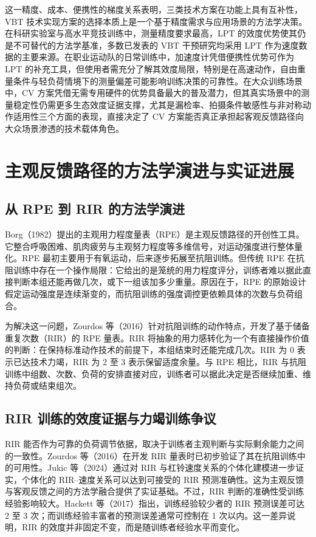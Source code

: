 \documentclass[UTF8,zihao=-4,twoside,openany]{ctexbook}
\begin{document}
这一精度、成本、便携性的梯度关系表明，三类技术方案在功能上具有互补性，VBT 技术实现方案的选择本质上是一个基于精度需求与应用场景的方法学决策。在科研实验室与高水平竞技训练中，测量精度要求最高，LPT 的效度优势使其仍是不可替代的方法学基准，多数已发表的 VBT 干预研究均采用 LPT 作为速度数据的主要来源。在职业运动队的日常训练中，加速度计凭借便携性优势可作为 LPT 的补充工具，但使用者需充分了解其效度局限，特别是在高速动作，自由重量条件与轻负荷情境下的测量偏差可能影响训练决策的可靠性。在大众训练场景中，CV 方案凭借无需专用硬件的优势具备最大的普及潜力，但其真实场景中的测量稳定性仍需更多生态效度证据支撑，尤其是漏检率、拍摄条件敏感性与非对称动作适用性三个方面的表现，直接决定了 CV 方案能否真正承担起客观反馈路径向大众场景渗透的技术载体角色。

\section{主观反馈路径的方法学演进与实证进展}

\subsection{从 RPE 到 RIR 的方法学演进}
Borg（1982）提出的主观用力程度量表（RPE）是主观反馈路径的开创性工具。它整合呼吸困难、肌肉疲劳与主观努力程度等多维信号，对运动强度进行整体量化。RPE 最初主要用于有氧运动，后来逐步拓展至抗阻训练。但传统 RPE 在抗阻训练中存在一个操作局限：它给出的是笼统的用力程度评分，训练者难以据此直接判断本组还能再做几次，或下一组该加多少重量。原因在于，RPE 的原始设计假定运动强度是连续渐变的，而抗阻训练的强度调控更依赖具体的次数与负荷组合。

为解决这一问题，Zourdos 等（2016）针对抗阻训练的动作特点，开发了基于储备重复次数（RIR）的 RPE 量表。RIR 将抽象的用力感转化为一个有直接操作价值的判断：在保持标准动作技术的前提下，本组结束时还能完成几次。RIR 为 0 表示已达技术力竭，RIR 为 2 至 3 表示保留适度余量。与 RPE 相比，RIR 与抗阻训练中组数、次数、负荷的安排直接对应，训练者可以据此决定是否继续加重、维持负荷或结束组次。

\subsection{RIR 训练的效度证据与力竭训练争议}
RIR 能否作为可靠的负荷调节依据，取决于训练者主观判断与实际剩余能力之间的一致性。Zourdos 等（2016）在开发 RIR 量表时已初步验证了其在抗阻训练中的可用性。Jukic 等（2024）通过对 RIR 与杠铃速度关系的个体化建模进一步证实，个体化的 RIR--速度关系可以达到可接受的 RIR 预测准确性。这为主观反馈与客观反馈之间的方法学融合提供了实证基础。不过，RIR 判断的准确性受训练经验影响较大。Hackett 等（2017）指出，训练经验较少者的 RIR 预测误差可达 2 至 3 次；而训练经验丰富者的预测误差通常可控制在 1 次以内。这一差异说明，RIR 的效度并非固定不变，而是随训练者经验水平而变化。
\end{document}

